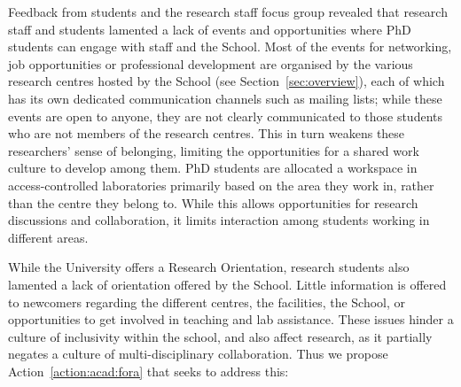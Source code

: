 Feedback from students and the research staff focus group revealed that research staff and students lamented a lack of events and opportunities where PhD students can engage with staff and the School. 
Most of the events for networking, job opportunities or professional development are organised by the various research centres hosted by the School (see Section~\ref{sec:overview}), each of which has its own dedicated communication channels such as mailing lists; while these events are open to anyone, they are not clearly communicated to those students who are not members of the research centres. 
This in turn weakens these researchers' sense of belonging, limiting the opportunities for a shared work culture to develop among them. %
PhD students are allocated a workspace in access-controlled laboratories primarily based on the area they work in, rather than the centre they belong to. While this allows opportunities for research discussions and collaboration, it limits interaction among students working in different areas. %

While the University offers a Research Orientation, research students also lamented a lack of orientation offered by the School.  Little information is offered to newcomers regarding the different centres, the facilities, the School, or opportunities to get involved in teaching and lab assistance.  %
These issues hinder a culture of inclusivity within the school, and also affect research, as it partially negates a culture of multi-disciplinary collaboration. 
Thus we propose Action~\ref{action:acad:fora} that seeks to address this:


